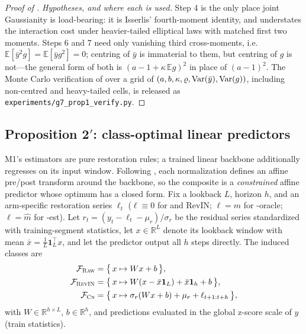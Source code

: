 \begin{proof}[Proof of ]
\emph{Hypotheses, and where each is used.} Step 4 is the only place joint Gaussianity is
load-bearing: it is Isserlis' fourth-moment identity, and  understates the
interaction cost under heavier-tailed elliptical laws with matched first two moments.
Steps 6 and 7 need only vanishing third cross-moments, i.e.\ $\mathbb{E}[\bar y^2 g] =
\mathbb{E}[\bar y g^2] = 0$; centring of $\bar y$ is immaterial to them, but centring of
$g$ is not---the general form of both is $(a - 1 + \kappa\,\mathbb{E} g)^2$ in place of
$(a-1)^2$. The Monte Carlo verification of  over a grid
of $(a, b, \kappa, \varrho, \mathrm{Var}(\bar y), \mathrm{Var}(g))$, including non-centred and
heavy-tailed cells, is released as \texttt{experiments/g7\_prop1\_verify.py}.
\end{proof}

\subsection{Proposition 2$'$: class-optimal linear predictors}\label{app:proofs:prop2prime}

M1's estimators are pure restoration rules; a trained linear backbone additionally regresses on its input window. Following \citet{toner2024linear}, each normalization defines an affine pre/post transform around the backbone, so the composite is a \emph{constrained} affine predictor whose optimum has a closed form. Fix a lookback $L$, horizon $h$, and an arm-specific restoration series $\ell_t$ ($\ell \equiv 0$ for \rawm{} and RevIN; $\ell = m$ for \cnm{}-oracle; $\ell = \hat m$ for \cnm{}-est). Let $r_t = (y_t - \ell_t - \mu_r)/\sigma_r$ be the residual series standardized with training-segment statistics, let $x \in \mathbb{R}^L$ denote its lookback window with mean $\bar x = \tfrac1L \mathbf 1_L^\top x$, and let the predictor output all $h$ steps directly. The induced classes are
\begin{align}
  \mathcal{F}_{\textsc{Raw}} &= \big\{\, x \mapsto Wx + b \,\big\}, \notag\\
  \mathcal{F}_{\textsc{RevIN}} &= \big\{\, x \mapsto W(x - \bar x \mathbf 1_L) + \bar x \mathbf 1_h + b \,\big\}, \label{eq:app-revinclass}\\
  \mathcal{F}_{\textsc{Cn}} &= \big\{\, x \mapsto \sigma_r (Wx + b) + \mu_r + \ell_{t+1:t+h} \,\big\},\notag
\end{align}
with $W \in \mathbb{R}^{h\times L}$, $b \in \mathbb{R}^h$, and predictions evaluated in the global z-score scale of $y$ (train statistics).

